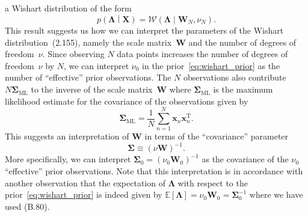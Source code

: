 \documentclass[12pt,a4paper]{article}
\begin{document}
a Wishart distribution of the form
\begin{equation}
p\left(\bm{\Lambda}\middle|\mathbf{X}\right) =
\mathcal{W}\left(\bm{\Lambda}\middle|\mathbf{W}_N, \nu_N\right) .
\end{equation}
This result suggests us how we can interpret the parameters of
the Wishart distribution~(2.155), namely
the scale matrix~$\mathbf{W}$ and the number of degrees of freedom~$\nu$.
Since observing $N$ data points increases the number of degrees of freedom~$\nu$ by $N$,
we can interpret $\nu_0$ in the prior~\eqref{eq:wishart_prior} as
the number of ``effective'' prior observations.
The $N$ observations also contribute $N\bm{\Sigma}_{\text{ML}}$ to
the inverse of the scale matrix~$\mathbf{W}$
where $\bm{\Sigma}_{\text{ML}}$ is the maximum likelihood estimate for the covariance of
the observations given by
\begin{equation}
\bm{\Sigma}_{\text{ML}} = \frac{1}{N} \sum_{n=1}^{N}\mathbf{x}_n\mathbf{x}_n^{\operatorname{T}} .
\end{equation}
This suggests an interpretation of $\mathbf{W}$ in terms of the ``covariance'' parameter
\begin{equation}
\bm{\Sigma} \equiv \left(\nu\mathbf{W}\right)^{-1} .
\label{eq:covariance_parameter}
\end{equation}
More specifically, we can interpret $\bm{\Sigma}_0 = \left(\nu_0\mathbf{W}_0\right)^{-1}$ as
the covariance of the $\nu_0$ ``effective'' prior observations.
Note that this interpretation is in accordance with another observation that
the expectation of $\bm{\Lambda}$ with respect to
the prior~\eqref{eq:wishart_prior} is indeed given by
$\mathbb{E}\left[\bm{\Lambda}\right] = \nu_0\mathbf{W}_0 = \bm{\Sigma}_0^{-1}$
where we have used (B.80).
\end{document}

